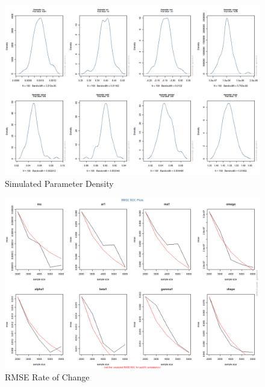 \begin{landscape}
\begin{figure}[!ht]
\centering
\includegraphics[width=22cm]{dist1.png}
\caption[GARCH Simulated Parameters Density]{Simulated Parameter Density}\label{fig:dist1}
\end{figure}
\begin{figure}[!ht]
\centering
\includegraphics[width=22cm]{dist11.png}
\caption[GARCH Parameters RMSE Rate of Change]{RMSE Rate of Change}\label{fig:dist2}
\end{figure}
\begin{figure}[!ht]
\centering
{}

\end{figure}
\end{landscape}
